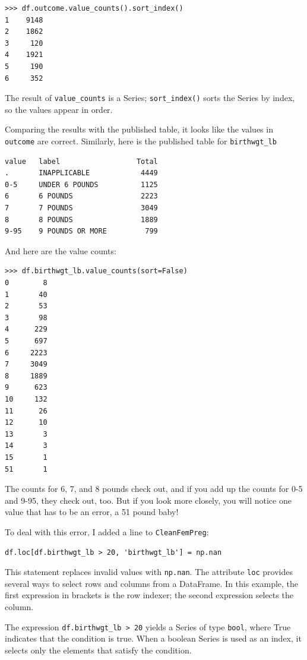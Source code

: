 \documentclass[12pt]{book}
\theoremstyle{exercise}
\begin{document}
\begin{verbatim}
>>> df.outcome.value_counts().sort_index()
1    9148
2    1862
3     120
4    1921
5     190
6     352
\end{verbatim}

The result of \verb"value_counts" is a Series;
\verb"sort_index()" sorts the Series by index, so the values
appear in order.

Comparing the results with the published table, it looks like the
values in {\tt outcome} are correct.  Similarly, here is the published
table for \verb"birthwgt_lb"

\begin{verbatim}
value   label                  Total
.       INAPPLICABLE            4449
0-5     UNDER 6 POUNDS          1125
6       6 POUNDS                2223
7       7 POUNDS                3049
8       8 POUNDS                1889
9-95    9 POUNDS OR MORE         799
\end{verbatim}

And here are the value counts:

\begin{verbatim}
>>> df.birthwgt_lb.value_counts(sort=False)
0        8
1       40
2       53
3       98
4      229
5      697
6     2223
7     3049
8     1889
9      623
10     132
11      26
12      10
13       3
14       3
15       1
51       1
\end{verbatim}

The counts for 6, 7, and 8 pounds check out, and if you add
up the counts for 0-5 and 9-95, they check out, too.  But
if you look more closely, you will notice one value that has to be
an error, a 51 pound baby!

To deal with this error, I added a line to {\tt CleanFemPreg}:

\begin{verbatim}
df.loc[df.birthwgt_lb > 20, 'birthwgt_lb'] = np.nan
\end{verbatim}

This statement replaces invalid values with {\tt np.nan}.
The attribute {\tt loc} provides several ways to select
rows and columns from a DataFrame.  In this example, the
first expression in brackets is the row indexer; the second
expression selects the column.%
%

The expression \verb"df.birthwgt_lb > 20" yields a Series of type
{\tt bool}, where True indicates that the condition is true.  When a
boolean Series is used as an index, it selects only the elements that
satisfy the condition.%
%
%
\end{document}
